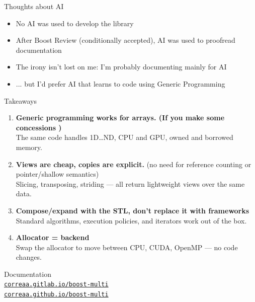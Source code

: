 \documentclass[t,aspectratio=169,handout]{beamer}
\begin{document}
\begin{frame}{Thoughts about AI}
  \begin{itemize}
    \item No AI was used to develop the library
    \item After Boost Review (conditionally accepted), AI was used to proofread documentation
    \item The irony isn't lost on me: I'm probably documenting mainly for AI
    \item ... but I'd prefer AI that learns to code using Generic Programming
  \end{itemize}
\end{frame}

\begin{frame}{Takeaways}

\begin{enumerate}
  \item \textbf{Generic programming works for arrays. (If you make some concessions )}\\
    The same code handles 1D\ldots ND, CPU and GPU, owned and borrowed memory.

  \item \textbf{Views are cheap, copies are explicit.} (no need for reference counting or pointer/shallow semantics)\\
    Slicing, transposing, striding --- all return lightweight views over the same data.

  \item \textbf{Compose/expand with the STL, don't replace it with frameworks}\\
    Standard algorithms, execution policies, and iterators work out of the box.

  \item \textbf{Allocator = backend}\\
    Swap the allocator to move between CPU, CUDA, OpenMP --- no code changes.
\end{enumerate}
\vfill
\begin{center}
  Documentation\\
  \Large\href{https://correaa.gitlab.io/boost-multi/}{\texttt{correaa.gitlab.io/boost-multi}}\\
  \Large\href{https://correaa.github.io/boost-multi/}{\texttt{correaa.github.io/boost-multi}}
\end{center}

\end{frame}

\ifdefined\framesStandalone
  
\end{document}
